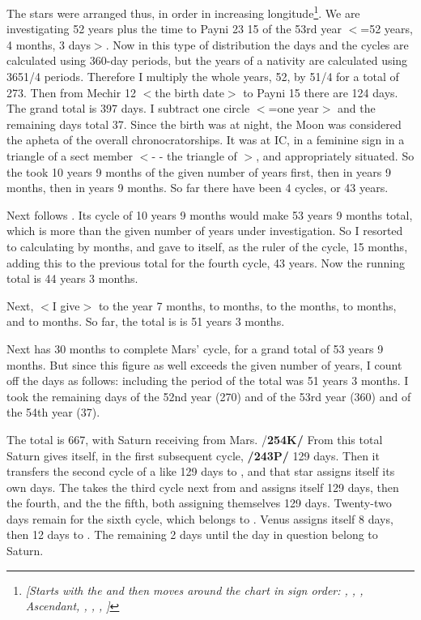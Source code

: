 The stars were arranged thus, in order in increasing longitude\footnote{\textit{[Starts with the \Moon\xspace and then moves around the chart in sign order: \Moon, \Venus, \Jupiter, Ascendant, \Saturn, \Mars, \Sun, \Mercury ]}}. We are investigating 52 years plus the time to Payni 23 15 of the 53rd year $<$=52 years, 4 months, 3 days$>$. Now in this type of distribution the days and the cycles are calculated using 360-day periods, but the years of a nativity are calculated using 3651/4 periods. Therefore I multiply the whole years, 52, by 51/4 for a total of 273. Then from Mechir 12 $<$the birth date$>$ to Payni 15 there are 124 days. The grand total is 397 days. I subtract one circle $<$=one year$>$ and the remaining days total 37. Since the birth was at night, the Moon was considered the apheta of the overall chronocratorships. It was at IC, in a feminine sign in a triangle of a sect member $<$\Pisces\xspace - \Cancer\xspace - \Scorpio  the triangle of \Venus$>$, and appropriately situated. So the \Moon\xspace took 10 years 9 months of the given number of years first, then \Venus\xspace in \Aries\xspace 10 years 9 months, then \Saturn\xspace in  years 9 months. So far there have been 4 cycles, or 43 years.

Next follows \Mars. Its cycle of 10 years 9 months would make 53 years 9 months total, which is more than the given number of years under investigation. So I resorted to calculating by months, and gave to \Mars\xspace itself, as the ruler of the cycle, 15 months, adding this to the previous total for the fourth cycle, 43 years. Now the running total is 44 years 3 months. 

Next, $<$I give$>$ to the \Sun\xspace 1 year 7 months, to \Mercury\xspace 20 months, to the \Moon\xspace 25 months, to \Venus\xspace 8 months, and to \Jupiter\xspace 12 months. So far, the total is is 51 years 3 months. 

Next \Saturn\xspace has 30 months to complete Mars’ cycle, for a grand total of 53 years 9 months. But since this figure as well exceeds the given number of years, I count off the days as follows: including the period of \Jupiter\xspace the total was 51 years 3 months. I took the remaining days of the 52nd year (270) and of the 53rd year (360) and of the 54th year (37). 

The total is 667, with Saturn receiving from Mars. /\textbf{254K/} From this total Saturn gives itself, in the first subsequent cycle, \textbf{/243P/} 129 days. Then it transfers the second cycle of a like 129 days to \Mars, and that star assigns itself its own days. The \Sun\xspace takes the third cycle next from \Saturn\xspace and assigns itself 129 days, then \Mercury\xspace the fourth, and the \Moon\xspace the fifth, both assigning themselves 129 days. Twenty-two days remain for the sixth cycle, which belongs to \Venus. Venus assigns itself 8 days, then 12 days to \Jupiter. The remaining 2 days until the day in question belong to Saturn. 

